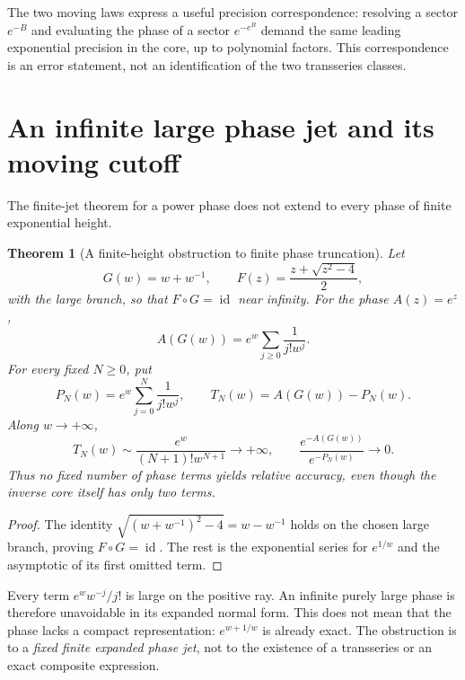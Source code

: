\documentclass[11pt,a4paper]{article}
\newtheorem{theorem}{Theorem}[section]
\theoremstyle{definition}
\theoremstyle{remark}
\newcommand{\id}{\operatorname{id}}
\numberwithin{equation}{section}
\begin{document}
The two moving laws express a useful precision correspondence: resolving a sector $e^{-B}$ and evaluating the phase of a sector $e^{-e^B}$ demand the same leading exponential precision in the core, up to polynomial factors. This correspondence is an error statement, not an identification of the two transseries classes.

\section{An infinite large phase jet and its moving cutoff}\label{sec:infinitejet}

The finite-jet theorem for a power phase does not extend to every phase of finite exponential height.

\begin{theorem}[A finite-height obstruction to finite phase truncation]\label{thm:infinitejet}
Let
\[
 G(w)=w+w^{-1},\qquad
 F(z)=\frac{z+\sqrt{z^2-4}}2,
\]
with the large branch, so that $F\circ G=\id$ near infinity. For the phase $A(z)=e^z$,
\[
 A(G(w))=e^w\sum_{j\ge0}\frac1{j!w^j}.
\]
For every fixed $N\ge0$, put
\[
 P_N(w)=e^w\sum_{j=0}^{N}\frac1{j!w^j},\qquad
 T_N(w)=A(G(w))-P_N(w).
\]
Along $w\to+\infty$,
\begin{equation}\label{eq:heighttailfixed}
 T_N(w)\sim\frac{e^w}{(N+1)!w^{N+1}}\longrightarrow+\infty,
 \qquad
 \frac{e^{-A(G(w))}}{e^{-P_N(w)}}\longrightarrow0.
\end{equation}
Thus no fixed number of phase terms yields relative accuracy, even though the inverse core itself has only two terms.
\end{theorem}
\begin{proof}
The identity $\sqrt{(w+w^{-1})^2-4}=w-w^{-1}$ holds on the chosen large branch, proving $F\circ G=\id$. The rest is the exponential series for $e^{1/w}$ and the asymptotic of its first omitted term.
\end{proof}

Every term $e^ww^{-j}/j!$ is large on the positive ray. An infinite purely large phase is therefore unavoidable in its expanded normal form. This does not mean that the phase lacks a compact representation: $e^{w+1/w}$ is already exact. The obstruction is to a \emph{fixed finite expanded phase jet}, not to the existence of a transseries or an exact composite expression.
\end{document}
